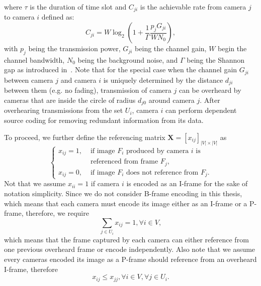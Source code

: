 where $\tau$ is the duration of time slot and $C_{ji}$ is the achievable rate from camera $j$ to camera $i$ defined as:
\begin{equation}
C_{ji} = W \log_2 \left( 1+\frac{1}{\Gamma} \frac{p_j G_{ji}}{WN_0} \right),
\label{eq::capacity}
\end{equation}
with $p_j$ being the transmission power, $G_{ji}$ being the channel gain, $W$ begin the channel bandwidth, $N_0$ being the background noise, and $\Gamma$ being the Shannon gap as introduced in~\cite{MQAM}.
Note that for the special case when the channel gain $G_{ji}$ between camera $j$ and camera $i$ is uniquely determined by the distance $d_{ji}$ between them (e.g. no fading), transmission of camera $j$ can be overheard by cameras that are inside the circle of radius $d_{j0}$ around camera $j$.
After overhearing transmissions from the set $U_i$, camera $i$ can perform dependent source coding for removing redundant information from its data.

To proceed, we further 
define the referencing matrix ${\mathbf{X} = [x_{ij}]_{|V| \times |V|}}$ as
\begin{equation*}
\left\{ \begin{array}{ll}
x_{ij} = 1, &\text{ if image $F_i$ produced by camera $i$ is} \\
                   &\text{ referenced from frame $F_j$,} \\
x_{ij} = 0, &\text{ if image $F_i$ does not reference from $F_j$.}
\end{array} \right.
\end{equation*}
Not that we assume $x_{ii}=1$ if camera $i$ is encoded as an I-frame for the sake of notation simplicity.
Since we do not consider B-frame encoding in this thesis, which means that each camera must encode its image either as an I-frame or a P-frame, therefore, we require
\begin{equation}
\sum_{j \in U_i} x_{ij} = 1, \forall i \in V,
\label{eq::referenceConstraint}
\end{equation}
which means that the frame captured by each camera can either reference from one previous overheard frame or encode independently.
Also note that we assume every cameras encoded its image as a P-frame should reference from an overheard I-frame, therefore
\begin{equation}
x_{ij} \leq x_{jj}, \forall i \in V, \forall j \in U_i.
\label{eq::referenceOnlyIframe}
\end{equation}

